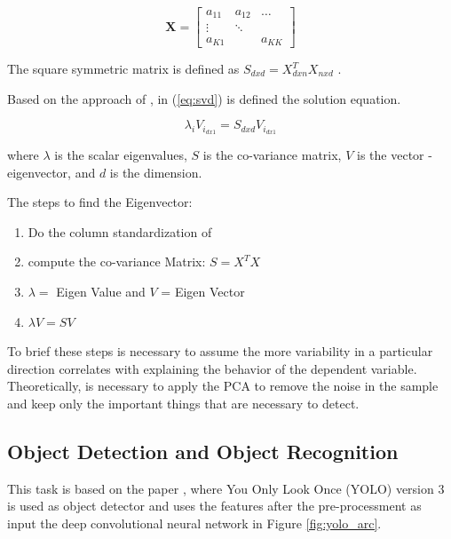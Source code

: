 \begin{equation}\label{eq:matrix}
    \mathbf{X} = \begin{bmatrix} 
    a_{11} & a_{12} & \dots \\
    \vdots & \ddots & \\
    a_{K1} &        & a_{KK} 
    \end{bmatrix}
\end{equation}

The square symmetric matrix is defined as $S_{dxd} = X^T_{dxn}X_{nxd}$ \cite{Halko_2011}. 

Based on the approach of \cite{cambridge2009introduction}, in (\ref{eq:svd}) is defined the solution equation.

\begin{equation}
    \label{eq:svd}
    \lambda_iV_i_{dx1} = S_{dxd}V_i_{dx1}
\end{equation}

where $\lambda$ is the scalar eigenvalues, $S$ is the co-variance matrix, $V$ is the vector - eigenvector, and $d$ is the dimension.

The steps to find the Eigenvector: 

\begin{enumerate}
    \item Do the column standardization of 
    \item compute the co-variance Matrix: $S = X^TX$
    \item $\lambda = $ Eigen Value and $V$ = Eigen Vector
    \item $\lambda V = SV$
\end{enumerate}

To brief these steps is necessary to assume the more variability in a particular direction correlates with explaining the behavior of the dependent variable. Theoretically, is necessary to apply the PCA to remove the noise in the sample and keep only the important things that are necessary to detect.


\subsection{Object Detection and Object Recognition} 

This task is based on the paper \cite{redmon2016you}, where You Only Look Once (YOLO) version 3 is used as object detector and uses the features after the pre-processment as input the deep convolutional neural network in Figure \ref{fig:yolo_arc}.  

